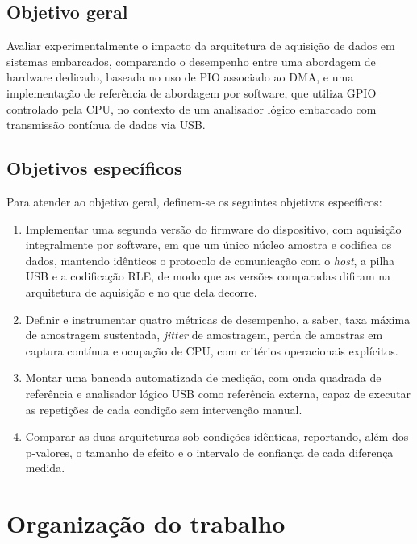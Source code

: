 \subsection{Objetivo geral}

Avaliar experimentalmente o impacto da arquitetura de aquisição de dados em
sistemas embarcados, comparando o desempenho entre uma abordagem de hardware
dedicado, baseada no uso de \ac{PIO} associado ao \ac{DMA}, e uma implementação
de referência de abordagem por software, que utiliza \ac{GPIO} controlado pela
\ac{CPU}, no contexto de um
analisador lógico embarcado com transmissão contínua de dados via \ac{USB}.

\subsection{Objetivos específicos}

Para atender ao objetivo geral, definem-se os seguintes objetivos específicos:

\begin{enumerate}
      \item Implementar uma segunda versão do firmware do dispositivo, com aquisição
            integralmente por software, em que um único núcleo amostra e codifica os
            dados, mantendo idênticos o protocolo de comunicação com o \emph{host}, a
            pilha \ac{USB} e a codificação \ac{RLE}, de modo que as versões comparadas
            difiram na arquitetura de aquisição e no que dela decorre.
      \item Definir e instrumentar quatro métricas de desempenho, a saber, taxa máxima de
            amostragem sustentada, \emph{jitter} de amostragem, perda de amostras em
            captura contínua e ocupação de \ac{CPU}, com critérios operacionais
            explícitos.
      \item Montar uma bancada automatizada de medição, com onda quadrada de referência e
            analisador lógico \ac{USB} como referência externa, capaz de executar as
            repetições de cada condição sem intervenção manual.
      \item Comparar as duas arquiteturas sob condições idênticas, reportando, além dos
            p-valores, o tamanho de efeito e o intervalo de confiança de cada diferença
            medida.
\end{enumerate}

\section{Organização do trabalho}

